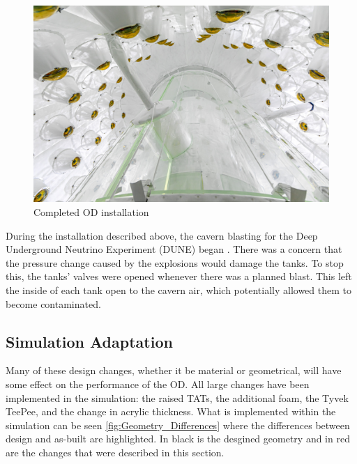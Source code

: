 \begin{figure}[]
\includegraphics[width=\textwidth]{Figures/Construction/od_complete.jpg}
\centering
\caption{Completed OD installation}
\label{fig:complete_od}
\end{figure}

\par
During the installation described above, the cavern blasting for the Deep Underground Neutrino Experiment (DUNE) began \cite{dune_blasting_ref}.
There was a concern that the pressure change caused by the explosions would damage the tanks.
To stop this, the tanks' valves were opened whenever there was a planned blast.
This left the inside of each tank open to the cavern air, which potentially allowed them to become contaminated.


\subsection{Simulation Adaptation}
\par
Many of these design changes, whether it be material or geometrical, will have some effect on the performance of the OD.
All large changes have been implemented in the simulation: the raised TATs, the additional foam, the Tyvek TeePee, and the change in acrylic thickness.
What is implemented within the simulation can be seen \autoref{fig:Geometry_Differences} where the differences between design and as-built are highlighted.
In black is the desgined geometry and in red are the changes that were described in this section.



